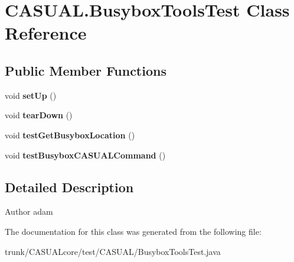 \hypertarget{classCASUAL_1_1BusyboxToolsTest}{\section{C\-A\-S\-U\-A\-L.\-Busybox\-Tools\-Test Class Reference}
\label{classCASUAL_1_1BusyboxToolsTest}
}
\subsection*{Public Member Functions}
\begin{DoxyCompactItemize}
\item 
\hypertarget{classCASUAL_1_1BusyboxToolsTest_ab3da2808620f039a7c0db77e04f2fab9}{void {\bfseries set\-Up} ()}\label{classCASUAL_1_1BusyboxToolsTest_ab3da2808620f039a7c0db77e04f2fab9}

\item 
\hypertarget{classCASUAL_1_1BusyboxToolsTest_ad11a4c54a3a4d613a31d86a3ea385d39}{void {\bfseries tear\-Down} ()}\label{classCASUAL_1_1BusyboxToolsTest_ad11a4c54a3a4d613a31d86a3ea385d39}

\item 
\hypertarget{classCASUAL_1_1BusyboxToolsTest_ad23f1f26c7d9435bd260fe64890b3e23}{void {\bfseries test\-Get\-Busybox\-Location} ()}\label{classCASUAL_1_1BusyboxToolsTest_ad23f1f26c7d9435bd260fe64890b3e23}

\item 
\hypertarget{classCASUAL_1_1BusyboxToolsTest_a59cd51babae66d18cc4a219f7b616517}{void {\bfseries test\-Busybox\-C\-A\-S\-U\-A\-L\-Command} ()}\label{classCASUAL_1_1BusyboxToolsTest_a59cd51babae66d18cc4a219f7b616517}

\end{DoxyCompactItemize}


\subsection{Detailed Description}
\begin{DoxyAuthor}{Author}
adam 
\end{DoxyAuthor}


The documentation for this class was generated from the following file\-:\begin{DoxyCompactItemize}
\item 
trunk/\-C\-A\-S\-U\-A\-Lcore/test/\-C\-A\-S\-U\-A\-L/Busybox\-Tools\-Test.\-java\end{DoxyCompactItemize}
